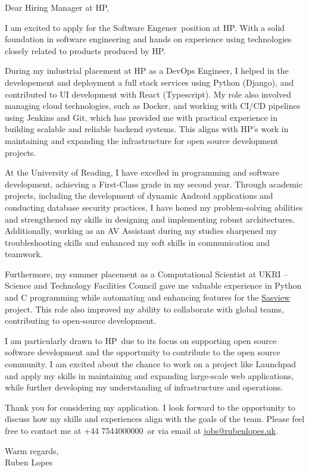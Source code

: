 \documentclass[a4paper, 12pt]{letter}
\def\phone{+44 7544000000}
\def\organisation{HP}
\def\position{Software Engener}
\def\customA{supporting open source software development and the opportunity to contribute to the open source community}
\def\customB{on a project like Launchpad and apply my skills in maintaining and expanding large-scale web applications}
\begin{document}
\begin{letter}{}

\opening{Dear Hiring Manager at \organisation,}

I am excited to apply for the \position\ position at \organisation. With a solid foundation in software engineering and hands on experience using technologies closely related to products produced by \organisation.

During my industrial placement at HP as a DevOps Engineer, I helped in the developement and deployment a full stack services using Python (Django), and contributed to UI development with React (Typescript). My role also involved managing cloud technologies, such as Docker, and working with CI/CD pipelines using Jenkins and Git, which has provided me with practical experience in building scalable and reliable backend systems. This aligns with \organisation’s work in maintaining and expanding the infrastructure for open source development projects.

At the University of Reading, I have excelled in programming and software development, achieving a First-Class grade in my second year. Through academic projects, including the development of dynamic Android applications and conducting database security practices, I have honed my problem-solving abilities and strengthened my skills in designing and implementing robust architectures. Additionally, working as an AV Assistant during my studies sharpened my troubleshooting skills and enhanced my soft skills in communication and teamwork.

Furthermore, my summer placement as a Computational Scientist at UKRI -- Science and Technology Facilities Council gave me valuable experience in Python and C programming while automating and enhancing features for the \href{https://www.sasview.org/}{Sasview} project. This role also improved my ability to collaborate with global teams, contributing to open-source development.

I am particularly drawn to \organisation\ due to its focus on \customA. I am excited about the chance to work \customB, while further developing my understanding of infrastructure and operations.

Thank you for considering my application. I look forward to the opportunity to discuss how my skills and experiences align with the goals of the team. Please feel free to contact me at \phone\ or via email at  \href{mailto:jobs@rubenlopes.uk}{jobs@rubenlopes.uk}.

\closing{Warm regards, \\ Ruben Lopes}

\end{letter}
\end{document}
